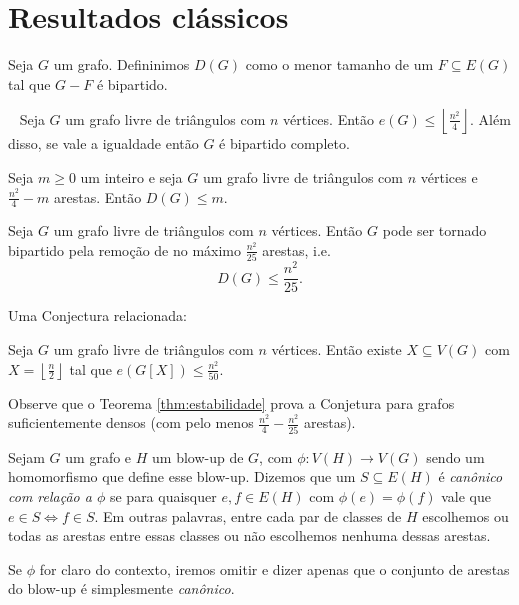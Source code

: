 \chapter{Resultados clássicos}
\label{cap:classicos}


Seja $G$ um grafo.
Defininimos $D(G)$ como o menor tamanho de um $F \subseteq E(G)$ tal que $G-F$ é bipartido.

\begin{theorem}[Mantel]~\label{thm:mantel}
  Seja $G$ um grafo livre de triângulos com $n$ vértices.
  Então $e(G) \leq \left\lfloor\frac{n^2}{4}\right\rfloor$.
  Além disso, se vale a igualdade então $G$ é bipartido completo.
\end{theorem}

\begin{theorem}[Estabilidade] \label{thm:estabilidade}
  Seja $m \geq 0$ um inteiro e seja $G$ um grafo livre de triângulos com $n$ vértices e $\frac{n^2}{4}-m$ arestas.
  Então $D(G) \leq m$.
\end{theorem}

\begin{conjecture}  \label{conj:make-bipartite}
  Seja $G$ um grafo livre de triângulos com $n$ vértices.
  Então $G$ pode ser tornado bipartido pela remoção de no máximo $\frac{n^2}{25}$ arestas,
  i.e. \[D(G) \leq \frac{n^2}{25}.\]
\end{conjecture}

Uma Conjectura relacionada:

\begin{conjecture}  \label{conj:metadinha}
  Seja $G$ um grafo livre de triângulos com $n$ vértices.
  Então existe $X \subseteq V(G)$ com $X = \left\lfloor \frac{n}{2} \right\rfloor$ tal que $e(G[X]) \leq \frac{n^2}{50}$.
\end{conjecture}

Observe que o Teorema \ref{thm:estabilidade} prova a Conjetura para grafos suficientemente densos (com pelo menos $\frac{n^2}{4} - \frac{n^2}{25}$ arestas).

\begin{definition}
  Sejam $G$ um grafo e $H$ um blow-up de $G$, com $\phi \colon V(H) \to V(G)$ sendo um homomorfismo que define esse blow-up.
  Dizemos que um $S \subseteq E(H)$ é \emph{canônico com relação a $\phi$} se para quaisquer $e,f \in E(H)$ com
  $\phi(e)=\phi(f)$ vale que $e \in S \iff f \in S$.
  Em outras palavras, entre cada par de classes de $H$ escolhemos ou todas as arestas entre essas classes ou não escolhemos nenhuma dessas arestas.
  
  Se $\phi$ for claro do contexto, iremos omitir e dizer apenas que o conjunto de arestas do blow-up é simplesmente \emph{canônico}.
\end{definition}

